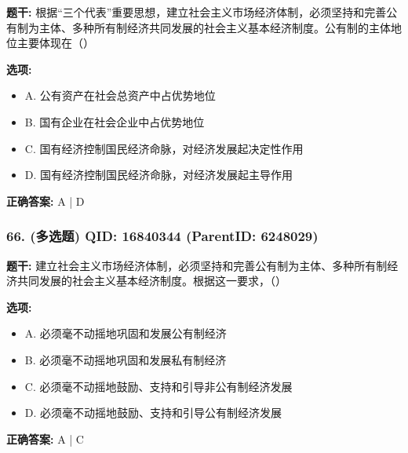 \documentclass[12pt,UTF8]{ctexart}
\begin{document}
\textbf{题干:}
根据“三个代表”重要思想，建立社会主义市场经济体制，必须坚持和完善公有制为主体、多种所有制经济共同发展的社会主义基本经济制度。公有制的主体地位主要体现在（）



\textbf{选项:}
\begin{itemize}[leftmargin=*]

  \item A. 公有资产在社会总资产中占优势地位

  \item B. 国有企业在社会企业中占优势地位

  \item C. 国有经济控制国民经济命脉，对经济发展起决定性作用

  \item D. 国有经济控制国民经济命脉，对经济发展起主导作用

\end{itemize}

\textbf{正确答案:}
A | D

\vspace{0.3em}\hrulefill\vspace{0.7em}

\subsubsection*{66. (多选题) \small QID: 16840344 (ParentID: 6248029)}

\textbf{题干:}
建立社会主义市场经济体制，必须坚持和完善公有制为主体、多种所有制经济共同发展的社会主义基本经济制度。根据这一要求，（）



\textbf{选项:}
\begin{itemize}[leftmargin=*]

  \item A. 必须毫不动摇地巩固和发展公有制经济

  \item B. 必须毫不动摇地巩固和发展私有制经济

  \item C. 必须毫不动摇地鼓励、支持和引导非公有制经济发展

  \item D. 必须毫不动摇地鼓励、支持和引导公有制经济发展

\end{itemize}

\textbf{正确答案:}
A | C

\vspace{0.3em}\hrulefill\vspace{0.7em}
\end{document}
